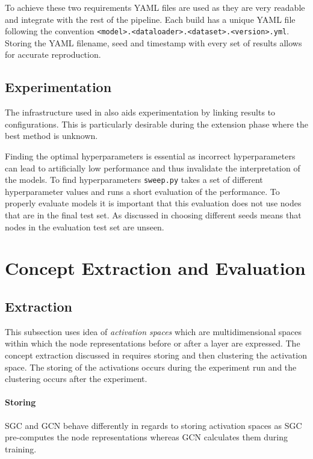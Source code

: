 To achieve these two requirements YAML files are used as they are very readable and integrate with the rest of the pipeline.
Each build has a unique YAML file following the convention \texttt{<model>.<dataloader>.<dataset>.<version>.yml}.
Storing the YAML filename, seed and timestamp with every set of results allows for accurate reproduction.

\subsection{Experimentation}
The infrastructure used in  also aids experimentation by linking results to configurations.
This is particularly desirable during the extension phase where the best method is unknown.

Finding the optimal hyperparameters is essential as incorrect hyperparameters can lead to artificially low performance and thus invalidate the interpretation of the models.
To find hyperparameters \texttt{sweep.py} takes a set of different hyperparameter values and runs a short evaluation of the performance.
To properly evaluate models it is important that this evaluation does not use nodes that are in the final test set.
As discussed in  choosing different seeds means that nodes in the evaluation test set are unseen.

\section{Concept Extraction and Evaluation}
\label{sec:concepts}

\subsection{Extraction}
\label{sec:extraction}

This subsection uses idea of \emph{activation spaces} which are multidimensional spaces within which the node representations before or after a layer are expressed.
The concept extraction discussed in  requires storing and then clustering the activation space.
The storing of the activations occurs during the experiment run and the clustering occurs after the experiment.

\paragraph{Storing}
SGC and GCN behave differently in regards to storing activation spaces as SGC pre-computes the node representations whereas GCN calculates them during training.

